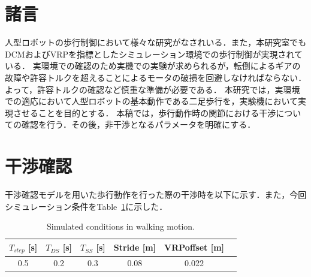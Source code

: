 \documentclass[11pt,a4paper]{jsarticle}
\begin{document}
\header

\section{諸言}
人型ロボットの歩行制御において様々な研究がなされいる．また，本研究室でもDCMおよびVRPを指標としたシミュレーション環境での歩行制御が実現されている．
実環境での確認のため実機での実験が求められるが，転倒によるギアの故障や許容トルクを超えることによるモータの破損を回避しなければならない．
よって，許容トルクの確認など慎重な準備が必要である．
本研究では，実環境での適応において人型ロボットの基本動作である二足歩行を，実験機において実現させることを目的とする．
本稿では，歩行動作時の関節における干渉についての確認を行う．その後，非干渉となるパラメータを明確にする．

\section{干渉確認}
干渉確認モデルを用いた歩行動作を行った際の干渉時を以下に示す．また，今回シミュレーション条件をTable~\ref{tab:table1}に示した．
\begin{table}[h]
  \centering
  \caption{Simulated conditions in walking motion.}
  \vspace{-2mm}
  \begin{tabular}[t]{|c|c|c|c|c|c|}
    \hline
    $T_{step}$ [s]& $T_{DS}$ [s]& $T_{SS}$ [s]& Stride [m] & VRPoffset [m]\\ \hline
    0.5 & 0.2 & 0.3 & 0.08 & 0.022\\ \hline
  \end{tabular}
  \label{tab:table1}
\end{table}
\end{document}
